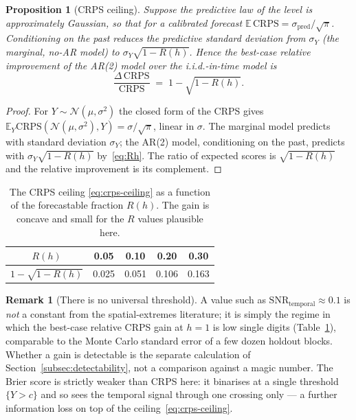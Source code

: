 \documentclass[11pt]{article}
\newtheorem{proposition}{Proposition}
\theoremstyle{definition}
\newtheorem{remark}{Remark}
\newcommand{\E}{\mathbb{E}}
\newcommand{\Norm}{\mathcal{N}}
\newcommand{\SNR}{\mathrm{SNR}_{\mathrm{temporal}}}
\begin{document}
\begin{proposition}[CRPS ceiling]
\label{prop:crps-ceiling}
Suppose the predictive law of the level is approximately Gaussian, so
that for a calibrated forecast $\E\,\mathrm{CRPS} = \sigma_{\mathrm{pred}}
/\sqrt{\pi}$. Conditioning on the past reduces the predictive standard
deviation from $\sigma_Y$ (the marginal, no-AR model) to
$\sigma_Y\sqrt{1-R(h)}$. Hence the best-case relative improvement of
the AR(2) model over the i.i.d.-in-time model is
\begin{equation}
  \frac{\Delta\,\mathrm{CRPS}}{\mathrm{CRPS}}
    \;=\; 1 - \sqrt{1 - R(h)}.
  \label{eq:crps-ceiling}
\end{equation}
\end{proposition}

\begin{proof}
For $Y\sim\Norm(\mu,\sigma^2)$ the closed form of the CRPS gives
$\E_{Y}\mathrm{CRPS}(\Norm(\mu,\sigma^2),Y) = \sigma/\sqrt\pi$, linear
in $\sigma$. The marginal model predicts with standard deviation
$\sigma_Y$; the AR(2) model, conditioning on the past, predicts with
$\sigma_Y\sqrt{1-R(h)}$ by~\eqref{eq:Rh}. The ratio of expected scores
is $\sqrt{1-R(h)}$ and the relative improvement is its complement.
\end{proof}

\begin{table}[h]
\centering
\caption{The CRPS ceiling \eqref{eq:crps-ceiling} as a function of the
         forecastable fraction $R(h)$. The gain is concave and small
         for the $R$ values plausible here.}
\label{tab:crps-ceiling}
\begin{tabular}{c c c c c}
\toprule
$R(h)$ & 0.05 & 0.10 & 0.20 & 0.30 \\
\midrule
$1-\sqrt{1-R(h)}$ & 0.025 & 0.051 & 0.106 & 0.163 \\
\bottomrule
\end{tabular}
\end{table}

\begin{remark}[There is no universal threshold]
\label{rem:no-threshold}
A value such as $\SNR\approx0.1$ is \emph{not} a constant from the
spatial-extremes literature; it is simply the regime in which the
best-case relative CRPS gain at $h=1$ is low single digits
(Table~\ref{tab:crps-ceiling}), comparable to the Monte Carlo standard
error of a few dozen holdout blocks. Whether a gain is detectable is
the separate calculation of Section~\ref{subsec:detectability}, not a
comparison against a magic number. The Brier score is strictly weaker
than CRPS here: it binarises at a single threshold $\{Y>c\}$ and so
sees the temporal signal through one crossing only --- a further
information loss on top of the ceiling~\eqref{eq:crps-ceiling}.
\end{remark}
\end{document}
